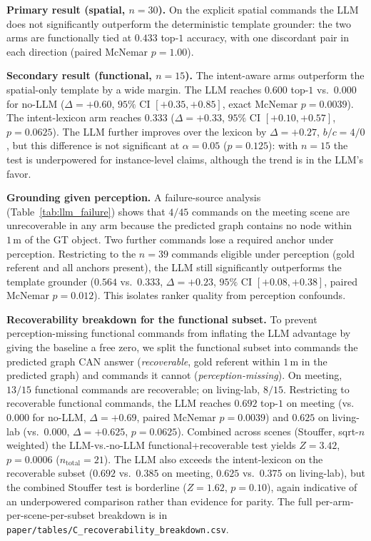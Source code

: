 \noindent\textbf{Primary result (spatial, $n=30$).}
On the explicit spatial commands the LLM does not significantly
outperform the deterministic template grounder: the two arms are
functionally tied at $0.433$ top-$1$ accuracy, with one discordant pair
in each direction (paired McNemar $p=1.00$).

\noindent\textbf{Secondary result (functional, $n=15$).}
The intent-aware arms outperform the spatial-only template by a wide
margin. The LLM reaches $0.600$ top-$1$ vs.\ $0.000$ for no-LLM
($\Delta=+0.60$, $95\%$ CI $[+0.35,+0.85]$, exact McNemar
$p=0.0039$). The intent-lexicon arm reaches $0.333$ ($\Delta=+0.33$,
$95\%$ CI $[+0.10,+0.57]$, $p=0.0625$). The LLM further improves over
the lexicon by $\Delta=+0.27$, $b/c=4/0$, but this difference is not
significant at $\alpha=0.05$ ($p=0.125$): with $n=15$ the test is
underpowered for instance-level claims, although the trend is in the
LLM's favor.

\noindent\textbf{Grounding given perception.}
A failure-source analysis (Table~\ref{tab:llm_failure}) shows that
$4/45$ commands on the meeting scene are unrecoverable in any arm
because the predicted graph contains no node within $1\,\mathrm{m}$
of the GT object. Two further commands lose a required anchor under
perception. Restricting to the $n=39$ commands eligible under
perception (gold referent and all anchors present), the LLM still
significantly outperforms the template grounder
($0.564$ vs.\ $0.333$, $\Delta=+0.23$, $95\%$ CI $[+0.08,+0.38]$,
paired McNemar $p=0.012$). This isolates ranker quality from
perception confounds.

\noindent\textbf{Recoverability breakdown for the functional subset.}
To prevent perception-missing functional commands from inflating the
LLM advantage by giving the baseline a free zero, we split the
functional subset into commands the predicted graph CAN answer
(\emph{recoverable}, gold referent within $1\,\mathrm{m}$ in the
predicted graph) and commands it cannot (\emph{perception-missing}).
On meeting, $13/15$ functional commands are recoverable; on
living-lab, $8/15$. Restricting to recoverable functional commands,
the LLM reaches $0.692$ top-$1$ on meeting (vs.\ $0.000$ for no-LLM,
$\Delta=+0.69$, paired McNemar $p=0.0039$) and $0.625$ on living-lab
(vs.\ $0.000$, $\Delta=+0.625$, $p=0.0625$). Combined across scenes
(Stouffer, sqrt-$n$ weighted) the LLM-vs.-no-LLM functional+recoverable
test yields $Z=3.42$, $p=0.0006$ ($n_{\mathrm{total}}=21$). The LLM
also exceeds the intent-lexicon on the recoverable subset
($0.692$ vs.\ $0.385$ on meeting, $0.625$ vs.\ $0.375$ on living-lab),
but the combined Stouffer test is borderline ($Z=1.62$, $p=0.10$),
again indicative of an underpowered comparison rather than evidence
for parity. The full per-arm-per-scene-per-subset breakdown is in
\texttt{paper/tables/C\_recoverability\_breakdown.csv}.

